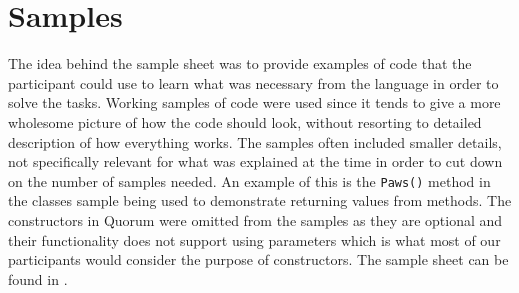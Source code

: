 \section{Samples}
The idea behind the sample sheet was to provide examples of code that the participant could use to learn what was necessary from the language in order to solve the tasks.
Working samples of code were used since it tends to give a more wholesome picture of how the code should look, without resorting to detailed description of how everything works.
The samples often included smaller details, not specifically relevant for what was explained at the time in order to cut down on the number of samples needed.
An example of this is the \lstinline!Paws()! method in the classes sample being used to demonstrate returning values from methods.
The constructors in Quorum were omitted from the samples as they are optional and their functionality does not support using parameters which is what most of our participants would consider the purpose of constructors.
The sample sheet can be found in .
